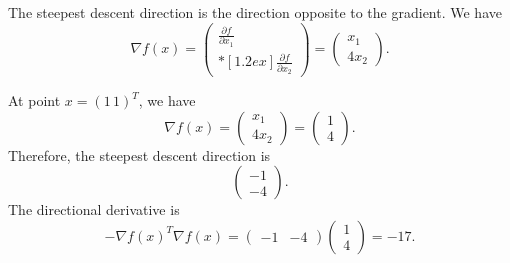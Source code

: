 
The steepest descent direction is the direction opposite to the
gradient. We have
$$\nabla f(x)
=
\begin{pmatrix}
\frac{\partial f}{\partial x_1}\\*[1.2ex]
\frac{\partial f}{\partial x_2}
\end{pmatrix}
=
\begin{pmatrix}
x_1\\
4x_2
\end{pmatrix}.$$

At point $x=(1 \, 1)^T$, we have
\[
\nabla f(x)
=
\begin{pmatrix}
x_1\\
4x_2
\end{pmatrix}
=
\begin{pmatrix}
1\\
4
\end{pmatrix}.
\]
Therefore, the steepest descent direction is
\[
\begin{pmatrix}
-1\\
-4
\end{pmatrix}.
\]
The directional derivative is
\[
-\nabla f(x)^T \nabla f(x)= \begin{pmatrix}
-1 & -4
\end{pmatrix}
\begin{pmatrix}
1\\
4
\end{pmatrix}
=
-17.
\]

